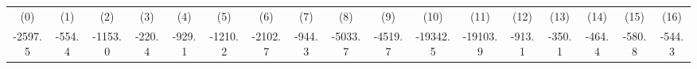 \begin{tabular}{ccccccccccccccccc}
(0) & (1) & (2) & (3) & (4) & (5) & (6) & (7) & (8) & (9) & (10) & (11) & (12) & (13) & (14) & (15) & (16) \\
-2597.5 & -554.4 & -1153.0 & -220.4 & -929.1 & -1210.2 & -2102.7 & -944.3 & -5033.7 & -4519.7 & -19342.5 & -19103.9 & -913.1 & -350.1 & -464.4 & -580.8 & -544.3 \\
\end{tabular}
